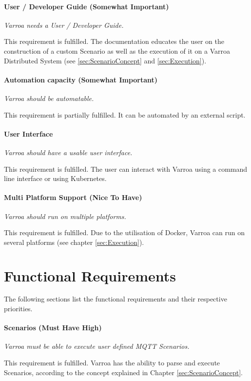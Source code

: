 \paragraph{User / Developer Guide (Somewhat Important)} 
\emph{Varroa needs a User / Developer Guide.}

This requirement is fulfilled.
The documentation educates the user on the construction of a custom Scenario as well as the execution of it on a Varroa Distributed System (see \ref{sec:ScenarioConcept} and \ref{sec:Execution}).

\paragraph{Automation capacity (Somewhat Important)} 
\emph{Varroa should be automatable.}

This requirement is partially fulfilled. It can be automated by an external script.

\paragraph{User Interface}
\emph{Varroa should have a usable user interface.}

This requirement is fulfilled.
The user can interact with Varroa using a command line interface or using Kubernetes.

\paragraph{Multi Platform Support (Nice To Have)}
\emph{Varroa should run on multiple platforms.}

This requirement is fulfilled.
Due to the utilisation of Docker, Varroa can run on several platforms (see chapter \ref{sec:Execution}).

\section{Functional Requirements}
The following sections list the functional requirements and their respective priorities.

\paragraph{Scenarios (Must Have High)}
\emph{Varroa must be able to execute user defined MQTT Scenarios.}

This requirement is fulfilled.
Varroa has the ability to parse and execute Scenarios, according to the concept explained in Chapter \ref{sec:ScenarioConcept}.

